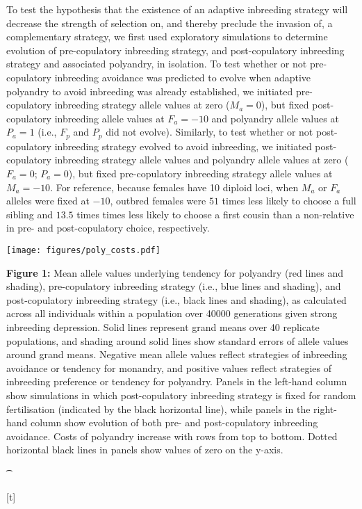 \documentclass[10pt,letterpaper]{article}
\begin{document}
To test the hypothesis that the existence of an adaptive inbreeding strategy will decrease the strength of selection on, and thereby preclude the invasion of, a complementary strategy, we first used exploratory simulations to determine evolution of pre-copulatory inbreeding strategy, and post-copulatory inbreeding strategy and associated polyandry, in isolation. To test whether or not pre-copulatory inbreeding avoidance was predicted to evolve when adaptive polyandry to avoid inbreeding was already established, we initiated pre-copulatory inbreeding strategy allele values at zero ($M_{a}=0$), but fixed post-copulatory inbreeding allele values at $F_{a}=-10$ and polyandry allele values at $P_{a}=1$ (i.e., $F_{p}$ and $P_{p}$ did not evolve). Similarly, to test whether or not post-copulatory inbreeding strategy evolved to avoid inbreeding, we initiated post-copulatory inbreeding strategy allele values and polyandry allele values at zero ($F_{a}=0$; $P_{a}=0$), but fixed pre-copulatory inbreeding strategy allele values at $M_{a}=-10$. For reference, because females have 10 diploid loci, when $M_{a}$ or $F_{a}$ alleles were fixed at $-10$, outbred females were $51$ times less likely to choose a full sibling and $13.5$ times times less likely to choose a first cousin than a non-relative in pre- and post-copulatory choice, respectively.

 {\color{Gray}
\begin{adjustwidth}{-2.2in}{0in}
{%
   \texttt{[image: figures/poly\_costs.pdf]}%
}%
{%
   \begin{justify}\vspace{10 mm} \textbf{Figure 1:} Mean allele values underlying tendency for polyandry (red lines and shading), pre-copulatory inbreeding strategy (i.e., blue lines and shading), and post-copulatory inbreeding strategy (i.e., black lines and shading), as calculated across all individuals within a population over 40000 generations given strong inbreeding depression. Solid lines represent grand means over 40 replicate populations, and shading around solid lines show standard errors of allele values around grand means. Negative mean allele values reflect strategies of inbreeding avoidance or tendency for monandry, and positive values reflect strategies of inbreeding preference or tendency for polyandry. Panels in the left-hand column show simulations in which post-copulatory inbreeding strategy is fixed for random fertilisation (indicated by the black horizontal line), while panels in the right-hand column show evolution of both pre- and post-copulatory inbreeding avoidance. Costs of polyandry increase with rows from top to bottom. Dotted horizontal black lines in panels show values of zero on the y-axis.\end{justify}{\t}%
}[t]
\end{adjustwidth}
}
\end{document}
